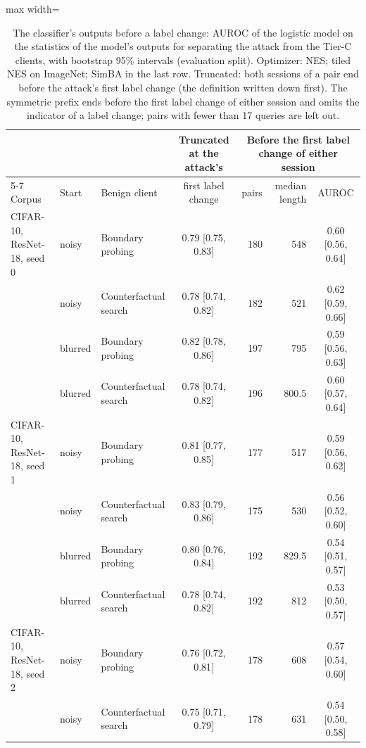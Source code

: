 \begin{table}
\centering\footnotesize\setlength{\tabcolsep}{4pt}
\caption{The classifier's outputs before a label change: AUROC of the logistic model on the statistics of the model's outputs for separating the attack from the Tier-C clients, with bootstrap 95\% intervals (evaluation split). Optimizer: NES; tiled NES on ImageNet; SimBA in the last row. Truncated: both sessions of a pair end before the attack's first label change (the definition written down first). The symmetric prefix ends before the first label change of either session and omits the indicator of a label change; pairs with fewer than 17 queries are left out.}
\label{tab:prefix}
\vspace{3pt}
\begin{adjustbox}{max width=\textheight}
\begin{tabular}{lllcrrc}
\toprule
& & & Truncated at the attack's & \multicolumn{3}{c}{Before the first label change of either session} \\
\cmidrule(lr){5-7}
Corpus & Start & Benign client & first label change & pairs & median length & AUROC \\
\midrule
CIFAR-10, ResNet-18, seed 0 & noisy & Boundary probing & 0.79 {[}0.75, 0.83{]} & 180 & 548 & 0.60 {[}0.56, 0.64{]} \\
 & noisy & Counterfactual search & 0.78 {[}0.74, 0.82{]} & 182 & 521 & 0.62 {[}0.59, 0.66{]} \\
 & blurred & Boundary probing & 0.82 {[}0.78, 0.86{]} & 197 & 795 & 0.59 {[}0.56, 0.63{]} \\
 & blurred & Counterfactual search & 0.78 {[}0.74, 0.82{]} & 196 & 800.5 & 0.60 {[}0.57, 0.64{]} \\[2pt]
CIFAR-10, ResNet-18, seed 1 & noisy & Boundary probing & 0.81 {[}0.77, 0.85{]} & 177 & 517 & 0.59 {[}0.56, 0.62{]} \\
 & noisy & Counterfactual search & 0.83 {[}0.79, 0.86{]} & 175 & 530 & 0.56 {[}0.52, 0.60{]} \\
 & blurred & Boundary probing & 0.80 {[}0.76, 0.84{]} & 192 & 829.5 & 0.54 {[}0.51, 0.57{]} \\
 & blurred & Counterfactual search & 0.78 {[}0.74, 0.82{]} & 192 & 812 & 0.53 {[}0.50, 0.57{]} \\[2pt]
CIFAR-10, ResNet-18, seed 2 & noisy & Boundary probing & 0.76 {[}0.72, 0.81{]} & 178 & 608 & 0.57 {[}0.54, 0.60{]} \\
 & noisy & Counterfactual search & 0.75 {[}0.71, 0.79{]} & 178 & 631 & 0.54 {[}0.50, 0.58{]} \\

\end{tabular}
\end{adjustbox}
\end{table}
